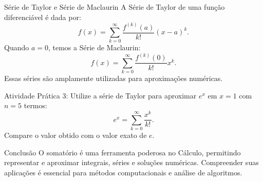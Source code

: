 \documentclass{beamer}
\begin{document}
\begin{frame}{Série de Taylor e Série de Maclaurin}
    A Série de Taylor de uma função diferenciável é dada por:
    \[
        f(x) = \sum_{k=0}^{\infty} \frac{f^{(k)}(a)}{k!} (x-a)^k.
    \]
    Quando \( a = 0 \), temos a Série de Maclaurin:
    \[
        f(x) = \sum_{k=0}^{\infty} \frac{f^{(k)}(0)}{k!} x^k.
    \]
    Essas séries são amplamente utilizadas para aproximações numéricas.
\end{frame}



\begin{frame}{Atividade Prática 3:}
    Utilize a série de Taylor para aproximar \( e^x \) em \( x=1 \) com \( n=5 \) termos:
    \[
        e^x = \sum_{k=0}^{\infty} \frac{x^k}{k!}.
    \]
    Compare o valor obtido com o valor exato de \( e \).
\end{frame}

\begin{frame}{Conclusão}
    O somatório é uma ferramenta poderosa no Cálculo, permitindo representar e aproximar integrais, séries e soluções numéricas.
    Compreender suas aplicações é essencial para métodos computacionais e análise de algoritmos.
\end{frame}
\end{document}
